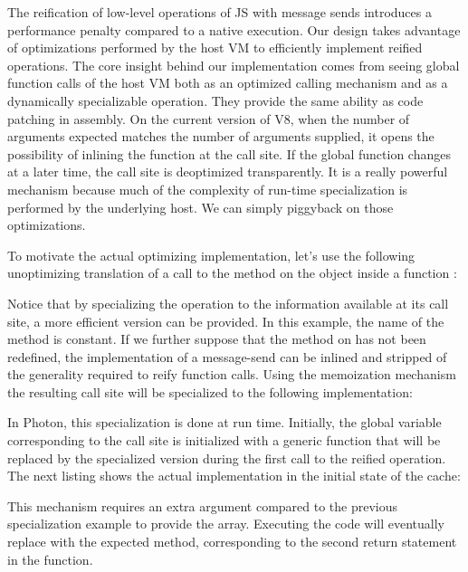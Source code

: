 The reification of low-level operations of JS with message sends introduces a
performance penalty compared to a native execution. Our design takes advantage
of optimizations performed by the host VM to efficiently implement reified
operations.  The core insight behind our implementation comes from seeing
global function calls of the host VM both as an optimized calling mechanism and
as a dynamically specializable operation. They provide the same ability as code
patching in assembly. On the current version of V8, when the number of
arguments expected matches the number of arguments supplied, it opens the
possibility of inlining the function at the call site. If the global function
changes at a later time, the call site is deoptimized transparently. It
is a really powerful mechanism because much of the complexity of run-time
specialization is performed by the underlying host.  We can simply piggyback on
those optimizations.

To motivate the actual optimizing implementation, let's use the following
unoptimizing translation of a call to the method  on the object
 inside a function :


Notice that by specializing the operation to the information available at its
call site, a more efficient version can be provided. In this example, the name
of the method is constant. If we further suppose that the  method on
 has not been redefined, the implementation of a
message-send can be inlined and stripped of the generality required to reify
function calls. Using the memoization mechanism the resulting call site will be
specialized to the following implementation:


In Photon, this specialization is done at run time. Initially, the global
variable corresponding to the call site is initialized with a generic function
that will be replaced by the specialized version during the first call to the
reified operation. The next listing shows the actual implementation in the
initial state of the cache:


This mechanism requires an extra argument compared to the previous
specialization example to provide the  array. Executing the code
will eventually replace  with the expected method, corresponding
to the second return statement in the  function.

